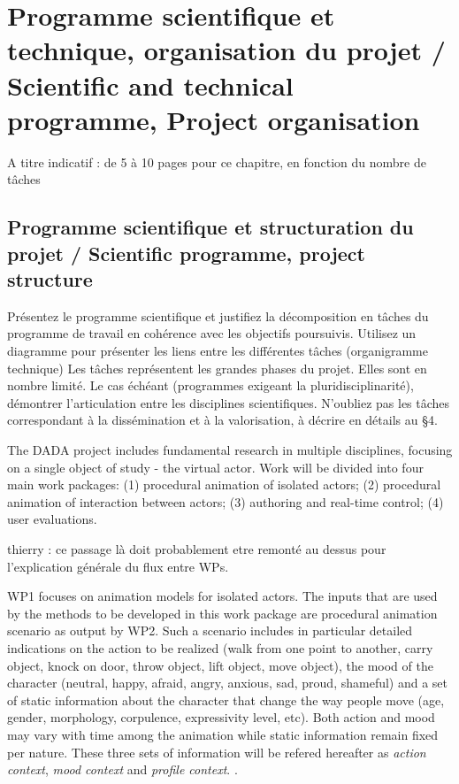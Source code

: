 
\section{Programme scientifique et technique, organisation du projet / Scientific and technical programme, Project organisation}
\begin{xcomment}  
A titre indicatif : de 5 à 10  pages pour ce chapitre, en fonction du nombre de tâches
\end{xcomment}

\subsection{Programme scientifique et structuration du projet  / Scientific programme, project structure}
\begin{xcomment}  
 Pr\'esentez le programme scientifique et justifiez la d\'ecomposition en tâches du programme de travail en coh\'erence avec les objectifs poursuivis. 
Utilisez un diagramme pour pr\'esenter les liens entre les diff\'erentes tâches (organigramme technique)
Les tâches repr\'esentent les grandes phases du projet. Elles sont en nombre limit\'e.
Le cas \'ech\'eant (programmes exigeant la pluridisciplinarit\'e), d\'emontrer l'articulation entre les disciplines scientifiques.
N'oubliez pas les tâches correspondant à la diss\'emination et à la valorisation, à d\'ecrire en d\'etails au §4.

\end{xcomment}

The DADA project includes fundamental research in multiple disciplines, focusing on a single object of study - the virtual actor. Work will be divided into four main work packages: (1) procedural animation of isolated actors; (2) procedural animation of interaction between actors; (3) authoring and real-time control; (4) user evaluations. 


\begin{xcomment}  
thierry : ce passage là doit probablement etre remonté au dessus pour l'explication générale du flux entre WPs. 
\end{xcomment}



WP1 focuses on animation models for isolated actors.  The inputs that are used by the methods to be developed in this work package are procedural animation scenario as output by WP2.  Such a scenario includes in particular detailed indications on the action to be realized (walk from one point to another, carry object, knock on door, throw object, lift object, move object), the mood of the character (neutral, happy, afraid, angry, anxious, sad, proud, shameful) and a set of static information about the character that change the way people move (age, gender, morphology, corpulence, expressivity level, etc). Both action and mood may vary with time among the animation while static information remain fixed per nature.  These three sets of information will be refered hereafter as \textit{action context}, \textit{mood context} and \textit{profile context}. . 

